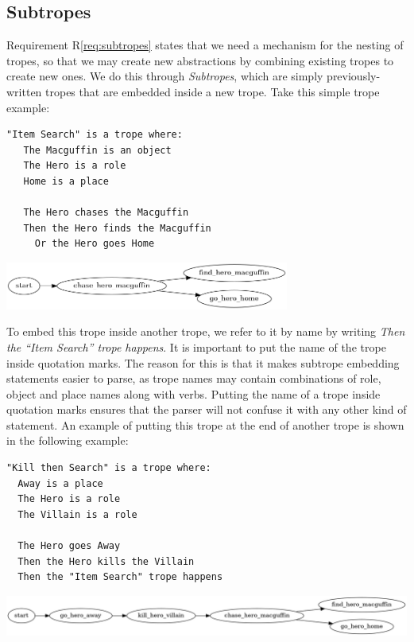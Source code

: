 \documentclass[11pt]{report}
\begin{document}
\subsection{Subtropes}
\label{sec:subtrope-code}
Requirement R\ref{req:subtropes} states that we need a mechanism for the
nesting of tropes, so that we may create new abstractions by combining existing
tropes to create new ones. We do this through \emph{Subtropes}, which are simply previously-written tropes that are embedded inside a
new trope. Take this simple trope example:

\begin{lstlisting}[showstringspaces=false, label={lst:subtrope1}, caption={Subtrope
to be embedded}]
"Item Search" is a trope where:
   The Macguffin is an object
   The Hero is a role
   Home is a place

   The Hero chases the Macguffin
   Then the Hero finds the Macguffin
     Or the Hero goes Home
\end{lstlisting}

\vspace{7mm}
\centerline{\includegraphics[width=0.7\textwidth]{subtrope1.png}}
\vspace{7mm}

To embed this trope inside another trope, we refer to it by name by writing
\emph{Then the ``Item Search'' trope happens}. It is important to put the name
of the trope inside quotation marks. The reason for this is that it makes
subtrope embedding statements easier to parse, as trope names may contain
combinations of role, object and place names along with verbs. Putting the name
of a trope inside quotation marks ensures that the parser will not confuse it
with any other kind of statement. An example of putting this trope at the end
of another trope is shown in the following example:

\begin{lstlisting}[showstringspaces=false, label={lst:subtrope2}, caption={Trope containing a subtrope}]
"Kill then Search" is a trope where:
  Away is a place
  The Hero is a role
  The Villain is a role

  The Hero goes Away
  Then the Hero kills the Villain
  Then the "Item Search" trope happens
\end{lstlisting}

\vspace{7mm}
\centerline{\includegraphics[width=\textwidth]{subtrope2.png}}
\vspace{7mm}
\end{document}

